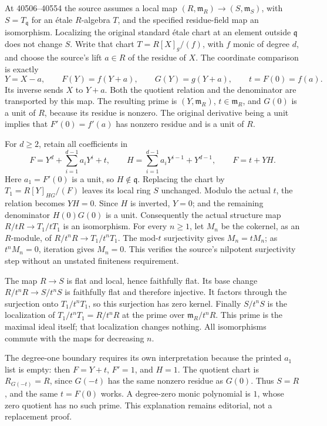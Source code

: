 At 40506--40554 the source assumes a local map \((R,\mathfrak m_R)\to(S,\mathfrak m_S)\), with \(S=T_{\mathfrak q}\) for an étale \(R\)-algebra \(T\), and the specified residue-field map an isomorphism. Localizing the original standard étale chart at an element outside \(\mathfrak q\) does not change \(S\). Write that chart \(T=R[X]_g/(f)\), with \(f\) monic of degree \(d\), and choose the source's lift \(a\in R\) of the residue of \(X\). The coordinate comparison is exactly \[
Y=X-a,\qquad F(Y)=f(Y+a),\qquad G(Y)=g(Y+a),\qquad
t=F(0)=f(a).
\] Its inverse sends \(X\) to \(Y+a\). Both the quotient relation and the denominator are transported by this map. The resulting prime is \((Y,\mathfrak m_R)\), \(t\in\mathfrak m_R\), and \(G(0)\) is a unit of \(R\), because its residue is nonzero. The original derivative being a unit implies that \(F'(0)=f'(a)\) has nonzero residue and is a unit of \(R\).

For \(d\geq2\), retain all coefficients in \[
F=Y^d+\sum_{i=1}^{d-1}a_iY^i+t,\qquad
H=\sum_{i=1}^{d-1}a_iY^{i-1}+Y^{d-1},\qquad F=t+YH.
\] Here \(a_1=F'(0)\) is a unit, so \(H\notin\mathfrak q\). Replacing the chart by \(T_1=R[Y]_{HG}/(F)\) leaves its local ring \(S\) unchanged. Modulo the actual \(t\), the relation becomes \(YH=0\). Since \(H\) is inverted, \(Y=0\); and the remaining denominator \(H(0)G(0)\) is a unit. Consequently the actual structure map \(R/tR\to T_1/tT_1\) is an isomorphism. For every \(n\geq1\), let \(M_n\) be the cokernel, as an \(R\)-module, of \(R/t^nR\to T_1/t^nT_1\). The mod-\(t\) surjectivity gives \(M_n=tM_n\); as \(t^nM_n=0\), iteration gives \(M_n=0\). This verifies the source's nilpotent surjectivity step without an unstated finiteness requirement.

The map \(R\to S\) is flat and local, hence faithfully flat. Its base change \(R/t^nR\to S/t^nS\) is faithfully flat and therefore injective. It factors through the surjection onto \(T_1/t^nT_1\), so this surjection has zero kernel. Finally \(S/t^nS\) is the localization of \(T_1/t^nT_1=R/t^nR\) at the prime over \(\mathfrak m_R/t^nR\). This prime is the maximal ideal itself; that localization changes nothing. All isomorphisms commute with the maps for decreasing \(n\).

The degree-one boundary requires its own interpretation because the printed \(a_1\) list is empty: then \(F=Y+t\), \(F'=1\), and \(H=1\). The quotient chart is \(R_{G(-t)}=R\), since \(G(-t)\) has the same nonzero residue as \(G(0)\). Thus \(S=R\), and the same \(t=F(0)\) works. A degree-zero monic polynomial is \(1\), whose zero quotient has no such prime. This explanation remains editorial, not a replacement proof.

